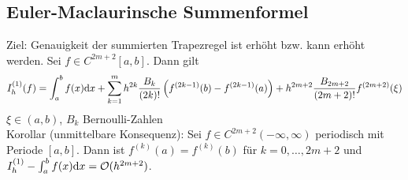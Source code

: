 \subsection{Euler-Maclaurinsche Summenformel}
Ziel: Genauigkeit der summierten Trapezregel ist erhöht bzw. kann erhöht werden.
 Sei $f \in C^{2m+2}[a,b]$. Dann gilt
\begin{align*}
  I_h^{(1)}(f) = \int_a^b f(x) \mathrm{d}x + \sum^{m}_{k=1} h^{2k} \frac{B_k}{(2k)!} \left(f^{(2k-1)}(b) -
  f^{(2k-1)}(a)\right) + h^{2m+2}\frac{B_{2m+2}}{(2m+2)!} f^{(2m+2)}(\xi)
\end{align*}
$\xi \in (a,b)$, $B_k$ Bernoulli-Zahlen\\
Korollar (unmittelbare Konsequenz): Sei $f \in C^{2m+2}(-\infty, \infty)$ periodisch mit Periode $[a,b]$.
Dann ist $f^{(k)}(a) = f^{(k)}(b)$ für $k=0,\ldots,2m+2$ und 
$I_h^{(1)} - \int_a^b f(x) \mathrm{d}x = \mathcal{O}(h^{2m+2})$.

